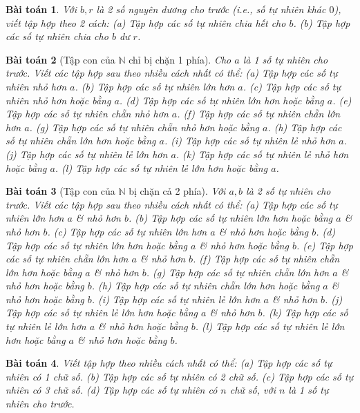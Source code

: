 \documentclass{article}
\newtheorem{baitoan}{Bài toán}
\begin{document}
\begin{baitoan}
	Với $b,r$ là 2 số nguyên dương cho trước (i.e., số tự nhiên khác $0$), viết tập hợp theo 2 cách: (a) Tập hợp các số tự nhiên chia hết cho $b$. (b) Tập hợp các số tự nhiên chia cho $b$ dư $r$.
\end{baitoan}

\begin{baitoan}[Tập con của $\mathbb{N}$ chỉ bị chặn 1 phía]
	Cho $a$ là 1 số tự nhiên cho trước. Viết các tập hợp sau theo nhiều cách nhất có thể: (a) Tập hợp các số tự nhiên nhỏ hơn $a$. (b) Tập hợp các số tự nhiên lớn hơn $a$. (c) Tập hợp các số tự nhiên nhỏ hơn hoặc bằng $a$. (d) Tập hợp các số tự nhiên lớn hơn hoặc bằng $a$. (e) Tập hợp các số tự nhiên chẵn nhỏ hơn $a$. (f) Tập hợp các số tự nhiên chẵn lớn hơn $a$. (g) Tập hợp các số tự nhiên chẵn nhỏ hơn hoặc bằng $a$. (h) Tập hợp các số tự nhiên chẵn lớn hơn hoặc bằng $a$. (i) Tập hợp các số tự nhiên lẻ nhỏ hơn $a$. (j) Tập hợp các số tự nhiên lẻ lớn hơn $a$. (k) Tập hợp các số tự nhiên lẻ nhỏ hơn hoặc bằng $a$. (l) Tập hợp các số tự nhiên lẻ lớn hơn hoặc bằng $a$.
\end{baitoan}

\begin{baitoan}[Tập con của $\mathbb{N}$ bị chặn cả 2 phía]
	Với $a,b$ là 2 số tự nhiên cho trước. Viết các tập hợp sau theo nhiều cách nhất có thể: (a) Tập hợp các số tự nhiên lớn hơn $a$ \& nhỏ hơn $b$. (b) Tập hợp các số tự nhiên lớn hơn hoặc bằng $a$ \& nhỏ hơn $b$. (c) Tập hợp các số tự nhiên lớn hơn $a$ \& nhỏ hơn hoặc bằng $b$. (d) Tập hợp các số tự nhiên lớn hơn hoặc bằng $a$ \& nhỏ hơn hoặc bằng $b$. (e) Tập hợp các số tự nhiên chẵn lớn hơn $a$ \& nhỏ hơn $b$. (f) Tập hợp các số tự nhiên chẵn lớn hơn hoặc bằng $a$ \& nhỏ hơn $b$. (g) Tập hợp các số tự nhiên chẵn lớn hơn $a$ \& nhỏ hơn hoặc bằng $b$. (h) Tập hợp các số tự nhiên chẵn lớn hơn hoặc bằng $a$ \& nhỏ hơn hoặc bằng $b$. (i) Tập hợp các số tự nhiên lẻ lớn hơn $a$ \& nhỏ hơn $b$. (j) Tập hợp các số tự nhiên lẻ lớn hơn hoặc bằng $a$ \& nhỏ hơn $b$. (k) Tập hợp các số tự nhiên lẻ lớn hơn $a$ \& nhỏ hơn hoặc bằng $b$. (l) Tập hợp các số tự nhiên lẻ lớn hơn hoặc bằng $a$ \& nhỏ hơn hoặc bằng $b$.
\end{baitoan}

\begin{baitoan}
	Viết tập hợp theo nhiều cách nhất có thể: (a) Tập hợp các số tự nhiên có 1 chữ số. (b) Tập hợp các số tự nhiên có 2 chữ số. (c) Tập hợp các số tự nhiên có 3 chữ số. (d) Tập hợp các số tự nhiên có $n$ chữ số, với $n$ là 1 số tự nhiên cho trước.
\end{baitoan}
\end{document}

